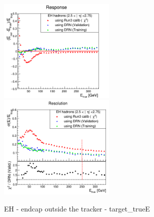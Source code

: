 \begin{figure}
\includegraphics[width=0.495\textwidth]{./HCAL_plots/Trained_target_ratioflip_0_500_10/pdf/EH_ec_out/EC_outside_tracker_corrEtaEndcapEcalHcal.png}
\includegraphics[width=0.495\textwidth]{./HCAL_plots/Trained_target_ratioflip_0_500_10/pdf/EH_ec_out/EC_outside_tracker_corrEtaEndcapEcalHcal_reso.png}
\caption{EH - endcap outside the tracker - target_trueE}
\end{figure}
